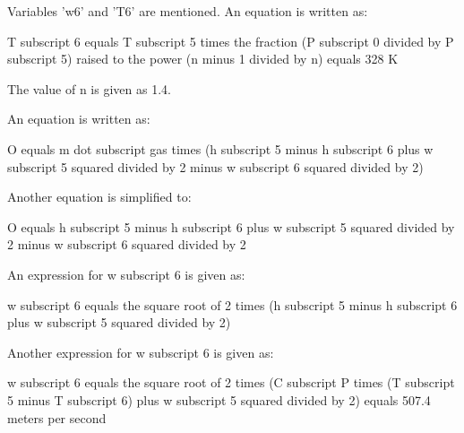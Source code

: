 Variables 'w6' and 'T6' are mentioned. An equation is written as:

T subscript 6 equals T subscript 5 times the fraction (P subscript 0 divided by P subscript 5) raised to the power (n minus 1 divided by n) equals 328 K

The value of n is given as 1.4.

An equation is written as:

O equals m dot subscript gas times (h subscript 5 minus h subscript 6 plus w subscript 5 squared divided by 2 minus w subscript 6 squared divided by 2)

Another equation is simplified to:

O equals h subscript 5 minus h subscript 6 plus w subscript 5 squared divided by 2 minus w subscript 6 squared divided by 2

An expression for w subscript 6 is given as:

w subscript 6 equals the square root of 2 times (h subscript 5 minus h subscript 6 plus w subscript 5 squared divided by 2)

Another expression for w subscript 6 is given as:

w subscript 6 equals the square root of 2 times (C subscript P times (T subscript 5 minus T subscript 6) plus w subscript 5 squared divided by 2) equals 507.4 meters per second